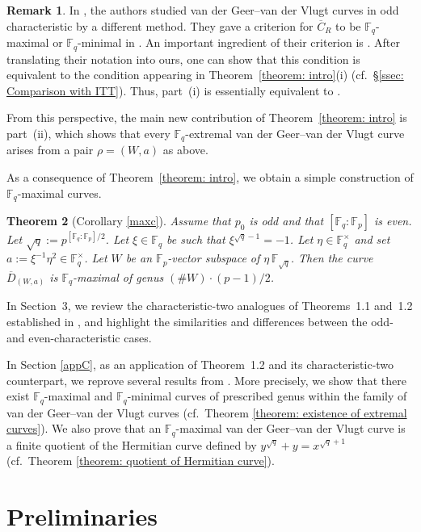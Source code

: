\documentclass[12pt,a4paper]{amsart}
\newtheorem{theorem}{Theorem}[section]
\theoremstyle{definition}
\newtheorem{remark}[theorem]{Remark}
\def\F{{\mathbb F}}
\theoremstyle{remark}
\begin{document}
\begin{remark}
In \cite{ITT}, the authors studied van der Geer--van der Vlugt curves in odd characteristic by a different method. They gave a criterion for $\overline{C}_R$ to be $\F_q$-maximal or $\F_q$-minimal in \cite[Theorem~4.11]{ITT}. An important ingredient of their criterion is \cite[Condition~4.6]{ITT}. After translating their notation into ours, one can show that this condition is equivalent to the condition appearing in Theorem~\ref{theorem: intro}(i) (cf.\ \S\ref{ssec: Comparison with ITT}). Thus, part~(i) is essentially equivalent to \cite[Theorem~4.11]{ITT}. 

From this perspective, the main new contribution of Theorem~\ref{theorem: intro} is part~(ii), which shows that every $\F_q$-extremal van der Geer--van der Vlugt curve arises from a pair $\rho=(W,a)$ as above. 
\end{remark}



As a consequence of Theorem~\ref{theorem:  intro}, we obtain a simple construction of $\F_q$-maximal curves.
\begin{theorem}[Corollary \ref{maxc}]
Assume that $p_0$ is odd and that $[\F_q:\F_p]$ is even. Let 
$\sqrt{q}:=p^{[\F_q:\F_p]/2}$. 
Let $\xi \in \F_q$ be such that $\xi^{\sqrt{q}-1}=-1$.
Let 
$\eta \in \F_q^{\times}$ and set 
$a:=\xi^{-1} \eta^2 \in \F_q^{\times}$. Let $W$ be an $\F_p$-vector subspace of $\eta\, \F_{\sqrt{q}}$. 
Then the curve $\overline{D}_{(W,a)}$ is $\F_q$-maximal of genus 
$(\# W) \cdot (p-1)/2$. 
\end{theorem}


 In Section~3, we review the characteristic-two analogues of Theorems~1.1 and~1.2 established in \cite{ITT1}, and highlight the similarities and differences between the odd- and even-characteristic cases.

In Section \ref{appC}, as an application of Theorem~1.2 and its characteristic-two counterpart, 
 we reprove several results from \cite{CO0}. 
More precisely, we show that there exist $\F_q$-maximal and $\F_q$-minimal curves of prescribed genus within the family of van der Geer--van der Vlugt curves (cf.\ Theorem \ref{theorem: existence of extremal curves}). 
We also prove that an $\F_q$-maximal 
van der Geer--van der Vlugt curve  is a finite quotient of 
the Hermitian curve defined by $y^{\sqrt{q}}+y=x^{\sqrt{q}+1}$ (cf.\ Theorem \ref{theorem: quotient of Hermitian curve}). 



\section{Preliminaries}
\end{document}
